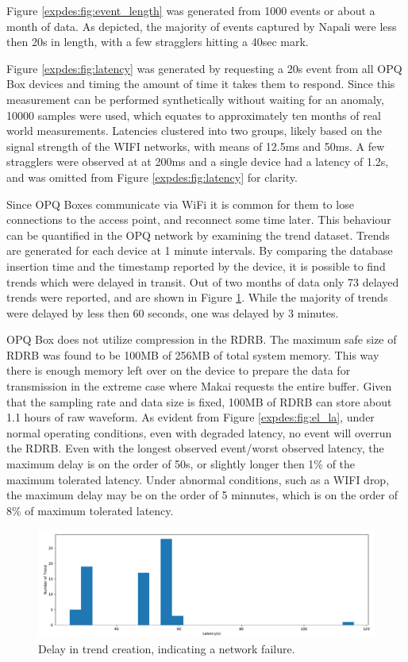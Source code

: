Figure \ref{expdes:fig:event_length} was generated from 1000 events or about a month of data.
As depicted, the majority of events captured by Napali were less then 20s in length, with a few stragglers hitting a 40sec mark.

Figure \ref{expdes:fig:latency} was generated by requesting a 20s event from all OPQ Box devices and timing the amount of time it takes them to respond.
Since this measurement can be performed synthetically without waiting for an anomaly, 10000 samples were used, which equates to approximately ten months of real world measurements.
Latencies clustered into two groups, likely based on the signal strength of the WIFI networks, with means of 12.5ms and 50ms.
A few stragglers were observed at at 200ms and a single device had a latency of 1.2s, and was omitted from Figure \ref{expdes:fig:latency} for clarity.

Since OPQ Boxes communicate via WiFi it is common for them to lose connections to the access point, and reconnect some time later.
This behaviour can be quantified in the OPQ network by examining the trend dataset.
Trends are generated for each device at 1 minute intervals.
By comparing the database insertion time and the timestamp reported by the device, it is possible to find trends which were delayed in transit.
Out of two months of data only 73 delayed trends were reported, and are shown in Figure \ref{expdes:fig:trend_latency}.
While the majority of trends were delayed by less then 60 seconds, one was delayed by 3 minutes.

OPQ Box does not utilize compression in the RDRB.
The maximum safe size of RDRB was found to be 100MB of 256MB of total system memory.
This way there is enough memory left over on the device to prepare the data for transmission in the extreme case where Makai requests the entire buffer.
Given that the sampling rate and data size is fixed, 100MB of RDRB can store about 1.1 hours of raw waveform.
As evident from Figure \ref{expdes:fig:el_la}, under normal operating conditions, even with degraded latency, no event will overrun the RDRB.
Even with the longest observed event/worst observed latency, the maximum delay is on the order of 50s, or slightly longer then 1\% of the maximum tolerated latency.
Under abnormal conditions, such as a WIFI drop, the maximum delay may be on the order of 5 minnutes, which is on the order of 8\% of maximum tolerated latency.

\begin{figure}[ht!]
    \centering
    \includegraphics[width=1\linewidth]{img/napali_eval/trend_latency.pdf}
    \caption{Delay in trend creation, indicating a network failure.}
    \label{expdes:fig:trend_latency}
\end{figure}



